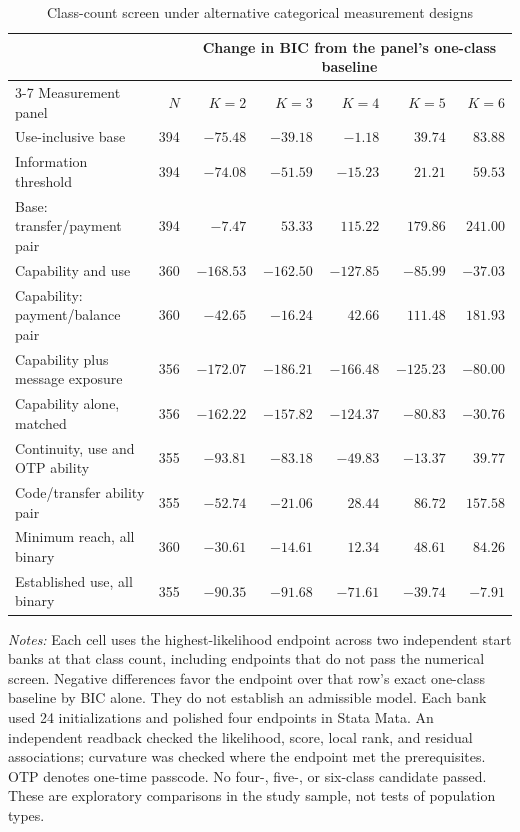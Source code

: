 \begin{table}[!htbp]
\centering
\caption{Class-count screen under alternative categorical measurement designs}
\label{tab:discrete-lca-sensitivity}
\small
\begin{tabular}{@{}lrrrrrr@{}}
\toprule
 & & \multicolumn{5}{c}{Change in BIC from the panel's one-class baseline} \\
\cmidrule(lr){3-7}
Measurement panel & $N$ & $K=2$ & $K=3$ & $K=4$ & $K=5$ & $K=6$ \\
\midrule
Use-inclusive base & 394 & $-75.48$ & $-39.18$ & $-1.18$ & $39.74$ & $83.88$ \\
Information threshold & 394 & $-74.08$ & $-51.59$ & $-15.23$ & $21.21$ & $59.53$ \\
Base: transfer/payment pair & 394 & $-7.47$ & $53.33$ & $115.22$ & $179.86$ & $241.00$ \\
Capability and use & 360 & $-168.53$ & $-162.50$ & $-127.85$ & $-85.99$ & $-37.03$ \\
Capability: payment/balance pair & 360 & $-42.65$ & $-16.24$ & $42.66$ & $111.48$ & $181.93$ \\
Capability plus message exposure & 356 & $-172.07$ & $-186.21$ & $-166.48$ & $-125.23$ & $-80.00$ \\
Capability alone, matched & 356 & $-162.22$ & $-157.82$ & $-124.37$ & $-80.83$ & $-30.76$ \\
Continuity, use and OTP ability & 355 & $-93.81$ & $-83.18$ & $-49.83$ & $-13.37$ & $39.77$ \\
Code/transfer ability pair & 355 & $-52.74$ & $-21.06$ & $28.44$ & $86.72$ & $157.58$ \\
Minimum reach, all binary & 360 & $-30.61$ & $-14.61$ & $12.34$ & $48.61$ & $84.26$ \\
Established use, all binary & 355 & $-90.35$ & $-91.68$ & $-71.61$ & $-39.74$ & $-7.91$ \\
\bottomrule
\end{tabular}
\par\smallskip
\begin{minipage}{0.98\linewidth}\footnotesize\raggedright
\textit{Notes:} Each cell uses the highest-likelihood endpoint across two independent start banks at that class count, including endpoints that do not pass the numerical screen. Negative differences favor the endpoint over that row's exact one-class baseline by BIC alone. They do not establish an admissible model. Each bank used 24 initializations and polished four endpoints in Stata Mata. An independent readback checked the likelihood, score, local rank, and residual associations; curvature was checked where the endpoint met the prerequisites. OTP denotes one-time passcode. No four-, five-, or six-class candidate passed. These are exploratory comparisons in the study sample, not tests of population types.
\end{minipage}
\end{table}

